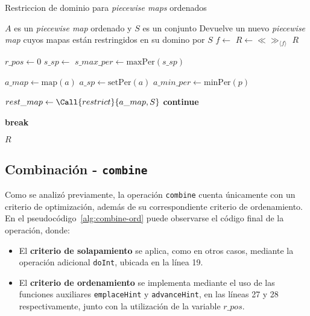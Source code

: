 \begin{algorithm}
\caption{Restriccion de dominio para \textit{piecewise maps} ordenados}
\label{alg:restrict-ord}
\begin{algorithmic}[1]
\Require $A$ es un \textit{piecewise map} ordenado y $S$ es un conjunto
\Ensure Devuelve un nuevo \textit{piecewise map} cuyos mapas están restringidos en su domino por $S$
    \State $f \gets$ 
    \State $R \gets \ll\gg_{\langle f \rangle}$
        \State \Return $R$
    \EndIf

    \State $r\_pos \gets 0$
    \State $s\_sp \gets$ 
    \State $s\_max\_per \gets \mathrm{maxPer}(s\_sp)$

        \State  $a\_map \gets \mathrm{map}(a)$
        \State  $a\_sp \gets \mathrm{setPer}(a)$
        \State $a\_min\_per \gets \mathrm{minPer}(p)$
    

            \State $rest\_map \gets \Call{restrict}{a\_map,S}$
                \State {}
                \State {}
            \EndIf
            \State \textbf{continue}
        \EndIf

            \State \textbf{break}
        \EndIf

    \EndFor

    \State \Return $R$
\EndFunction
\end{algorithmic}
\end{algorithm}

\subsection{Combinación - \texttt{combine}}

Como se analizó previamente, la operación \texttt{combine} cuenta únicamente con un criterio de optimización, además de su correspondiente criterio de ordenamiento. En el pseudocódigo~\ref{alg:combine-ord} puede observarse el código final de la operación, donde:

\begin{itemize}
    \item El \textbf{criterio de solapamiento} se aplica, como en otros casos, mediante la operación adicional \texttt{doInt}, ubicada en la línea 19.
    \item El \textbf{criterio de ordenamiento} se implementa mediante el uso de las funciones auxiliares \texttt{emplaceHint} y \texttt{advanceHint}, en las líneas 27 y 28 respectivamente, junto con la utilización de la variable $r\_pos$.
\end{itemize}


